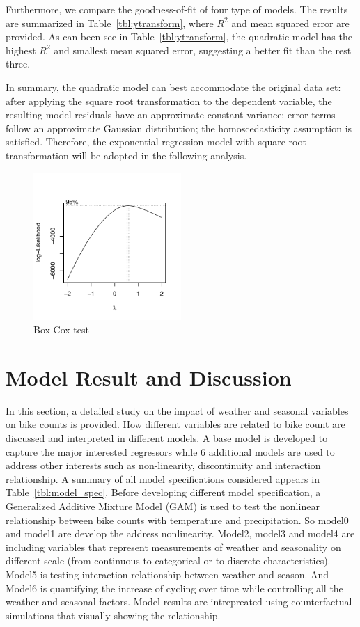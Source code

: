 \documentclass [11pt, proquest] {uwthesis}[2015/03/03]
\begin{document}
Furthermore, we compare the goodness-of-fit of four type of models. The results are summarized in Table~\ref{tbl:ytransform}, where $R^2$ and mean squared error are provided. As can been see in Table~\ref{tbl:ytransform}, the quadratic model has the highest $R^2$ and smallest mean squared error, suggesting a better fit than the rest three.

In summary, the quadratic model can best accommodate the original data set: after applying the square root transformation to the dependent variable, the resulting model residuals have an approximate constant variance; error terms follow an approximate Gaussian distribution; the homoscedasticity assumption is satisfied. Therefore, the exponential regression model with square root transformation will be adopted in the following analysis. 

\begin{figure}
\centering
   \includegraphics[width=0.5\textwidth]{figures/boxcox} 
  \caption{Box-Cox test }
  \label{fig:boxcox}
\end{figure}

\section{Model Result and Discussion}
\label{sec:intrepofresult}

In this section, a detailed study on the impact of weather and seasonal variables on bike counts is provided. How different variables are related to bike count are discussed and interpreted in different models. A base model is developed to capture the major interested regressors while 6 additional models are used to address other interests such as non-linearity, discontinuity and interaction relationship. A summary of all model specifications considered appears in Table~\ref{tbl:model_spec}. Before developing different model specification, a Generalized Additive Mixture Model (GAM) is used to test the nonlinear relationship between bike counts with temperature and precipitation. So model0 and model1 are develop the address nonlinearity. Model2, model3 and model4 are including variables that represent measurements of weather and seasonality on different scale (from continuous to categorical or to discrete characteristics). Model5 is testing interaction relationship between weather and season. And Model6 is quantifying the increase of cycling over time while controlling all the weather and seasonal factors. Model results are intrepreated using counterfactual simulations that visually showing the relationship. 
\end{document}
